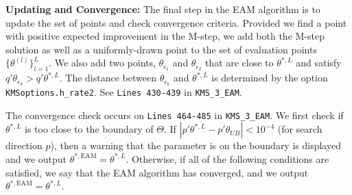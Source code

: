 \documentclass[12pt]{article}
\def\code#1{\texttt{#1}}
\begin{document}
\textbf{Updating and Convergence:}
The final step in the EAM algorithm is to update the set of points and check convergence criteria.  Provided we find a point with positive expected improvement in the M-step, we add both the M-step solution  as well as a uniformly-drawn point to the set of evaluation points $\{\theta^{(l)}\}_{l=1}^L$. We also add two points, $\theta_{\epsilon_1}$ and $\theta_{\epsilon_2}$ that are close to $\theta^{*,L}$ and satisfy $q'\theta_{\epsilon_k} > q' \theta^{*,L}$.  The distance between $\theta_{\epsilon_k}$ and $\theta^{*,L}$  is determined by the option \code{KMSoptions.h\_rate2}.  See \code{Lines 430-439} in \code{KMS\_3\_EAM}.

The convergence check occurs on \code{Lines 464-485} in \code{KMS\_3\_EAM}.  We first check if $\theta^{*,L}$ is too close to the boundary of $\Theta$.  If $|p' \theta^{*,L} - p' \theta_{UB}| < 10^{-4}$ (for search direction $p$), then a warning that the parameter is on the boundary is displayed and we output $\theta^{*,\text{EAM}} = \theta^{*,L}$.  Otherwise, if all of the following conditions are satisfied, we say that the EAM algorithm has converged, and we output $\theta^{*,\text{EAM}} = \theta^{*,L}$.
\end{document}
